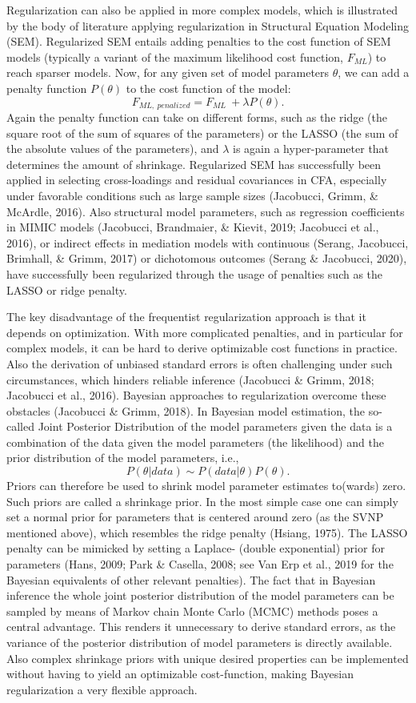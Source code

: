 \documentclass[
  man, donotrepeattitle,floatsintext]{apa6}
\begin{document}
Regularization can also be applied in more complex models, which is illustrated by the body of literature applying regularization in Structural Equation Modeling (SEM). Regularized SEM entails adding penalties to the cost function of SEM models (typically a variant of the maximum likelihood cost function, \(F_{ML}\)) to reach sparser models. Now, for any given set of model parameters \(\theta\), we can add a penalty function \(P(\theta)\) to the cost function of the model:
\[F_{ML, \ penalized} = F_{ML} \ + \lambda P(\theta).\]
Again the penalty function can take on different forms, such as the ridge (the square root of the sum of squares of the parameters) or the LASSO (the sum of the absolute values of the parameters), and \(\lambda\) is again a hyper-parameter that determines the amount of shrinkage. Regularized SEM has successfully been applied in selecting cross-loadings and residual covariances in CFA, especially under favorable conditions such as large sample sizes (Jacobucci, Grimm, \& McArdle, 2016). Also structural model parameters, such as regression coefficients in MIMIC models (Jacobucci, Brandmaier, \& Kievit, 2019; Jacobucci et al., 2016), or indirect effects in mediation models with continuous (Serang, Jacobucci, Brimhall, \& Grimm, 2017) or dichotomous outcomes (Serang \& Jacobucci, 2020), have successfully been regularized through the usage of penalties such as the LASSO or ridge penalty.

The key disadvantage of the frequentist regularization approach is that it depends on optimization. With more complicated penalties, and in particular for complex models, it can be hard to derive optimizable cost functions in practice. Also the derivation of unbiased standard errors is often challenging under such circumstances, which hinders reliable inference (Jacobucci \& Grimm, 2018; Jacobucci et al., 2016). Bayesian approaches to regularization overcome these obstacles (Jacobucci \& Grimm, 2018). In Bayesian model estimation, the so-called Joint Posterior Distribution of the model parameters given the data is a combination of the data given the model parameters (the likelihood) and the prior distribution of the model parameters, i.e.,
\[P({\theta} | data) \sim  P(data | \theta) P(\theta) .\]
Priors can therefore be used to shrink model parameter estimates to(wards) zero. Such priors are called a shrinkage prior. In the most simple case one can simply set a normal prior for parameters that is centered around zero (as the SVNP mentioned above), which resembles the ridge penalty (Hsiang, 1975). The LASSO penalty can be mimicked by setting a Laplace- (double exponential) prior for parameters (Hans, 2009; Park \& Casella, 2008; see Van Erp et al., 2019 for the Bayesian equivalents of other relevant penalties). The fact that in Bayesian inference the whole joint posterior distribution of the model parameters can be sampled by means of Markov chain Monte Carlo (MCMC) methods poses a central advantage. This renders it unnecessary to derive standard errors, as the variance of the posterior distribution of model parameters is directly available. Also complex shrinkage priors with unique desired properties can be implemented without having to yield an optimizable cost-function, making Bayesian regularization a very flexible approach.
\end{document}
